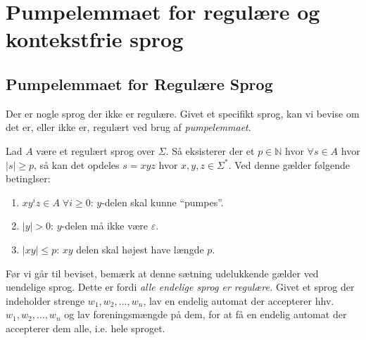 \chapter{Pumpelemmaet for regulære og kontekstfrie sprog}

\section{Pumpelemmaet for Regulære Sprog}%
\label{sec:pumpinglemmarl}

Der er nogle sprog der ikke er regulære. Givet et specifikt sprog, kan vi bevise om det er, eller ikke er, regulært ved brug af \textit{pumpelemmaet}.

\begin{theorem}[Pumpelemmaet]
	Lad $A$ være et regulært sprog over \(\Sigma\). Så eksisterer der et $p \in \mathbb{N}$ hvor \(\forall s \in A\) hvor $|s| \ge p$, så kan det opdeles $s = xyz$ hvor $x,y,z \in \Sigma^{*}$. Ved denne gælder følgende betinglser:
	\begin{enumerate}
		\item $xy^{i}z \in A \; \forall i \ge 0$: $y$-delen skal kunne ``pumpes''.
		\item $|y| > 0$: $y$-delen må ikke være $\varepsilon$.
		\item $|xy| \le p$: $xy$ delen skal højest have længde $p$.
	\end{enumerate}
\end{theorem}

Før vi går til beviset, bemærk at denne sætning udelukkende gælder ved uendelige sprog. Dette er fordi \textit{alle endelige sprog er regulære.} Givet et sprog der indeholder strenge $w_{1}, w_{2}, \ldots, w_{n}$, lav en endelig automat der accepterer hhv. $w_{1}, w_{2}, \ldots, w_{n}$ og lav foreningsmængde på dem, for at få en endelig automat der accepterer dem alle, i.e. hele sproget.

